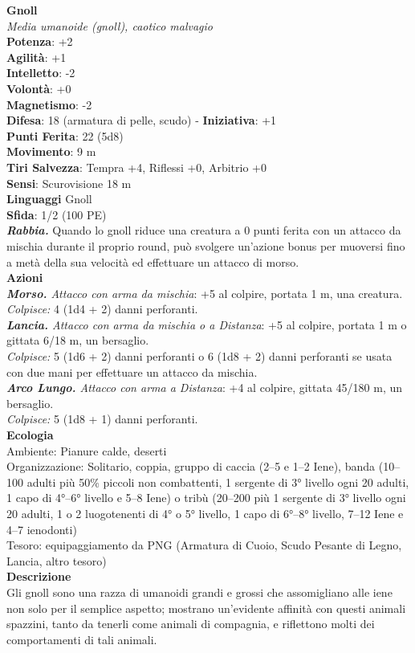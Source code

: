 \begin{multicols}{2}
\medskip\textbf{Gnoll}\\
\emph{Media umanoide (gnoll), caotico malvagio}\\
\textbf{Potenza}: +2\\
\textbf{Agilità}: +1\\
\textbf{Intelletto}: -2\\
\textbf{Volontà}: +0\\
\textbf{Magnetismo}: -2\\
\textbf{Difesa}: 18 (armatura di pelle, scudo) - \textbf{Iniziativa}: +1\\
\textbf{Punti Ferita}: 22 (5d8)\\
\textbf{Movimento}: 9 m\\
\textbf{Tiri Salvezza}: Tempra +4, Riflessi +0, Arbitrio +0\\
\textbf{Sensi}: Scurovisione 18 m\\
\textbf{Linguaggi} Gnoll\\
\textbf{Sfida}: 1/2 (100 PE)\smallskip\\
\emph{\textbf{Rabbia.}} Quando lo gnoll riduce una creatura a 0 punti ferita con un attacco da mischia durante il proprio round, può svolgere un'azione bonus per muoversi fino a metà della sua velocità ed effettuare un attacco di morso.\\
\smallskip\textbf{Azioni}\\
\emph{\textbf{Morso.} Attacco con arma da mischia}: +5 al colpire, portata 1 m, una creatura.\\
\emph{Colpisce:} 4 (1d4 + 2) danni perforanti.\\
\emph{\textbf{Lancia.} Attacco con arma da mischia o a Distanza}: +5 al colpire, portata 1 m o gittata 6/18 m, un bersaglio.\\
\emph{Colpisce:} 5 (1d6 + 2) danni perforanti o 6 (1d8 + 2) danni perforanti se usata con due mani per effettuare un attacco da mischia.\\
\emph{\textbf{Arco Lungo.} Attacco con arma a Distanza}: +4 al colpire, gittata 45/180 m, un bersaglio.\\
\emph{Colpisce:} 5 (1d8 + 1) danni perforanti.\\
\textbf{Ecologia}\\
Ambiente: Pianure calde, deserti\\
Organizzazione: Solitario, coppia, gruppo di caccia (2–5 e 1–2 Iene), banda (10–100 adulti più 50\% piccoli non combattenti, 1 sergente di 3° livello ogni 20 adulti, 1 capo di 4°–6° livello e 5–8 Iene) o tribù (20–200 più 1 sergente di 3° livello ogni 20 adulti, 1 o 2 luogotenenti di 4° o 5° livello, 1 capo di 6°–8° livello, 7–12 Iene e 4–7 ienodonti)\\
Tesoro: equipaggiamento da PNG (Armatura di Cuoio, Scudo Pesante di Legno, Lancia, altro tesoro)\\
\textbf{Descrizione}\\
Gli gnoll sono una razza di umanoidi grandi e grossi che assomigliano alle iene non solo per il semplice aspetto; mostrano un’evidente affinità con questi animali spazzini, tanto da tenerli come animali di compagnia, e riflettono molti dei comportamenti di tali animali.\\


\end{multicols}
